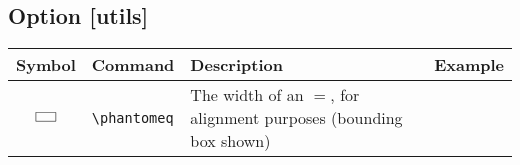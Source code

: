 \documentclass{article}
\begin{document}
\subsection*{Option [utils]}

\begin{tabular}{clll}
  \toprule
  Symbol & Command & Description & Example \\
  \midrule
  $\fbox{\phantomeq}$ & \verb|\phantomeq| & The width of an $=$, for alignment purposes (bounding box shown) \\
  \bottomrule
\end{tabular}
\end{document}
